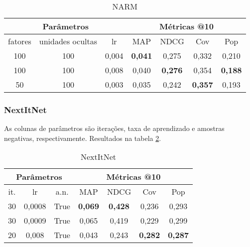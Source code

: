 \begin{table}[htbp]
  \centering
  \begin{tabular}{|c|c|c|c|c|c|c|}
    \hline
      \multicolumn{3}{|c|}{Parâmetros} & \multicolumn{4}{c|}{Métricas @10} \\
      \hline
      fatores & unidades ocultas & lr & MAP & NDCG & Cov & Pop \\
      \hline
      100 & 100 & 0,004 & \textbf{0,041} & 0,275 & 0,332 & 0,210 \\
      \hline
      100 & 100 & 0,008 & 0,040 & \textbf{0,276} & 0,354 & \textbf{0,188} \\
      \hline
      50 & 100 & 0,003 & 0,035 & 0,242 & \textbf{0,357} & 0,193 \\
      \hline
\end{tabular}
      \caption{NARM}
      \label{opt:NARM_rem}
\end{table}

\subsubsection{NextItNet}

As colunas de parâmetros são iterações, taxa de aprendizado e amostras
negativas, respectivamente. Resultados na tabela \ref{opt:NextItNet_rem}.
\begin{table}[htbp]
  \centering
  \begin{tabular}{|c|c|c|c|c|c|c|}
    \hline
      \multicolumn{3}{|c|}{Parâmetros} & \multicolumn{4}{c|}{Métricas @10} \\
      \hline
      it. & lr & a.n. & MAP & NDCG & Cov & Pop \\
      \hline
      30 & 0,0008 & True & \textbf{0,069} & \textbf{0,428} & 0,236 & 0,293 \\
      \hline
      30 & 0,0009 & True & 0,065 & 0,419 & 0,229 & 0,299 \\
      \hline
      20 & 0,008 & True & 0,043 & 0,243 & \textbf{0,282} & \textbf{0,287} \\
      \hline
\end{tabular}
      \caption{NextItNet}
      \label{opt:NextItNet_rem}
\end{table}

